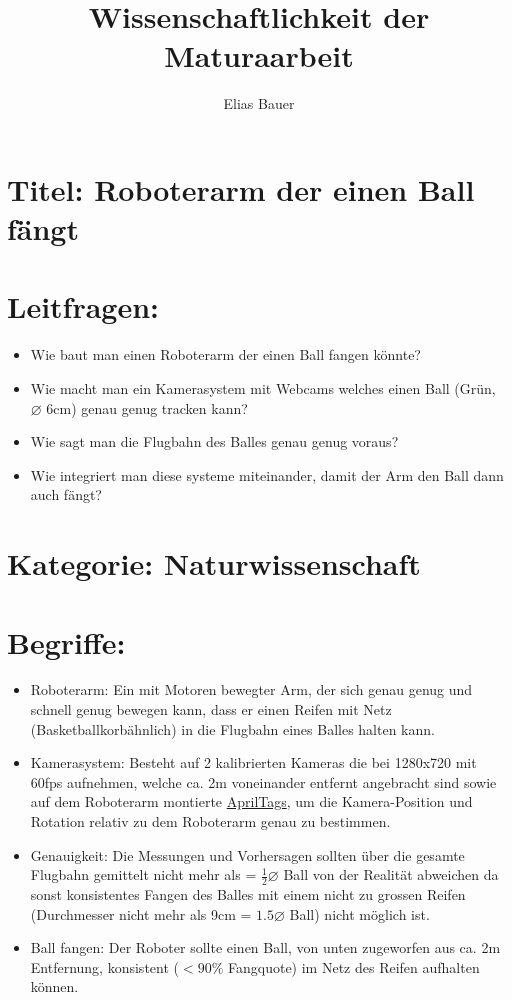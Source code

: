 \documentclass{article}
\title {Wissenschaftlichkeit der Maturaarbeit}
\author{Elias Bauer}
\date{}
\begin{document}
\maketitle

\section*{Titel: \small Roboterarm der einen Ball fängt}

\section*{Leitfragen:}
\begin{itemize}
	\item Wie baut man einen Roboterarm der einen Ball fangen könnte?
	\item Wie macht man ein Kamerasystem mit Webcams welches einen Ball (Grün, $\diameter$ 6cm) genau genug tracken kann?
	\item Wie sagt man die Flugbahn des Balles genau genug voraus?
	\item Wie integriert man diese systeme miteinander, damit der Arm den Ball dann auch fängt?
\end{itemize}

\section*{Kategorie: \small Naturwissenschaft}

\section*{Begriffe:}

\begin{itemize}
	\item Roboterarm: Ein mit Motoren bewegter Arm, der sich genau genug und schnell genug bewegen kann,
	      dass er einen Reifen mit Netz (Basketballkorbähnlich) in die Flugbahn eines Balles halten kann.
	\item Kamerasystem: Besteht auf 2 kalibrierten Kameras die bei 1280x720 mit 60fps aufnehmen, welche ca. 2\si{\meter} voneinander entfernt angebracht sind sowie auf dem Roboterarm montierte \href{https://github.com/AprilRobotics/apriltag}{AprilTags}, um die Kamera-Position und Rotation relativ zu dem Roboterarm genau zu bestimmen.
	\item Genauigkeit: Die Messungen und Vorhersagen sollten über die gesamte Flugbahn gemittelt nicht mehr
	      als \newline 3cm = $\frac{1}{2} \diameter$ Ball von der Realität abweichen da sonst konsistentes Fangen des Balles mit einem nicht zu grossen Reifen
	      (Durchmesser nicht mehr als 9cm = $1.5\diameter$ Ball) nicht möglich ist.
	\item Ball fangen: Der Roboter sollte einen Ball, von unten zugeworfen aus ca. 2m Entfernung, konsistent \newline ($< 90\%$ Fangquote) im Netz des Reifen aufhalten können.
\end{itemize}
\end{document}
